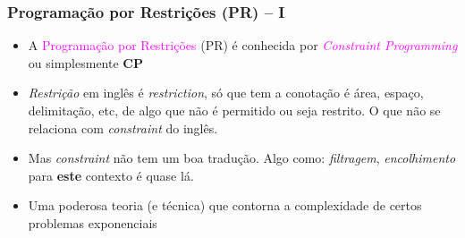 \documentclass{beamer}
\begin{document}
\begin{frame}[fragile]

 \frametitle{Programação por Restrições (PR) -- I}

   \begin{block}{}
     \begin{itemize}
     
      \item A \textcolor{magenta}{Programação por Restrições} (PR) é conhecida por \textcolor{magenta}{\textit{Constraint Programming}} 
      ou simplesmente \textbf{CP}
      
      \item {\em Restrição} em inglês é {\em restriction}, só que tem  a conotação é área, espaço, delimitação, etc, de algo que não é permitido ou seja restrito. O que não se relaciona com {\em constraint} do inglês.
      
      \item Mas {\em constraint}  não tem um boa tradução. Algo como: {\em filtragem}, {\em encolhimento} para {\bf este} contexto é quase lá.

      \pause
      \item Uma poderosa teoria (e técnica)  que  contorna a complexidade de certos problemas exponenciais
             
    \end{itemize}
    
    \end{block}
    
\end{frame}
\end{document}
